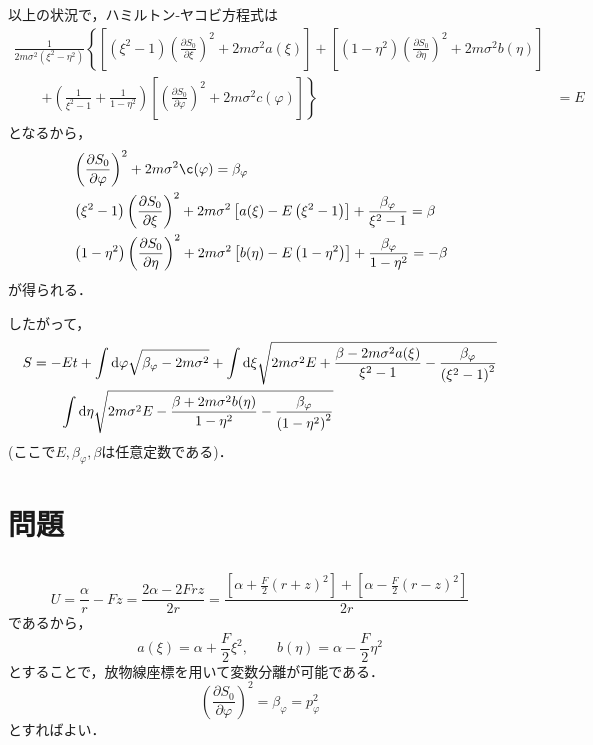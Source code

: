 \documentclass[a4paper,12pt]{jsarticle}
\newcommand{\pdif}[2]{\frac{\partial #1}{\partial #2}}
\begin{document}
	以上の状況で，ハミルトン-ヤコビ方程式は
	\begin{align}
	\frac{1}{2m \sigma^2 \left( \xi^2 - \eta^2 \right)} \left\{
	\left[ \left( \xi^2 - 1 \right)
	\left( \pdif{S_0}{\xi} \right)^2 + 2m \sigma^2 a(\xi) \right]
	+ \left[ \left( 1 - \eta^2 \right) \left( \pdif{S_0}{\eta} \right)^2
	+ 2m \sigma^2 b(\eta) \right] \right. & \\
	\qquad \left. + \left( \frac{1}{\xi^2 - 1} + \frac{1}{1 - \eta^2}\right)
	\left[ \left( \pdif{S_0}{\varphi} \right)^2
	+ 2m\sigma^2 c(\varphi) \right]
	\right\} &= E
	\end{align}
	となるから，
	\begin{align}
	&\left( \pdif{S_0}{\varphi} \right)^2 + 2m \sigma^2 \c(\varphi)
	= \beta_{\varphi} \\
	&\left( \xi^2 - 1 \right) \left( \pdif{S_0}{\xi} \right)^2
	+ 2m \sigma^2 \left[ a(\xi) - E \left( \xi^2 - 1 \right) \right]
	+ \frac{\beta_{\varphi}}{\xi^2 - 1} = \beta \\
	&\left( 1 - \eta^2 \right) \left( \pdif{S_0}{\eta} \right)^2
	+ 2m \sigma^2 \left[ b(\eta) - E \left( 1 - \eta^2 \right) \right]
	+ \frac{\beta_{\varphi}}{1 - \eta^2} = -\beta
	\end{align}
	が得られる．
	
	したがって，
	\begin{align}
	S &= -Et
	+ \int {\rm d} \varphi \sqrt{\beta_{\varphi} - 2m \sigma^2}
	+ \int{\rm d} \xi \sqrt{2m \sigma^2 E
		+ \frac{\beta - 2m \sigma^2 a(\xi)}{\xi^2 - 1}
		- \frac{\beta_{\varphi}}{\left( \xi^2 - 1 \right)^2}} \\
	&\qquad \int {\rm d} \eta \sqrt{2m \sigma^2 E
		- \frac{\beta + 2m \sigma^2 b(\eta)}{1 - \eta^2}
		- \frac{\beta_{\varphi}}{\left( 1 - \eta^2 \right)^2}}
	\end{align}
	(ここで$E, \beta_{\varphi}, \beta$は任意定数である)．
	
	\section{問題}
	\subsection{}
	\begin{equation}
	U = \frac{\alpha}{r} - Fz = \frac{2\alpha - 2Frz}{2r}
	=\frac{\left[ \alpha + \frac{F}{2}(r+z)^2 \right]
		+ \left[ \alpha - \frac{F}{2}(r-z)^2 \right]}{2r}
	\end{equation}
	であるから，
	\begin{equation}
	a(\xi) = \alpha + \frac{F}{2}\xi^2, \qquad
	b(\eta) = \alpha - \frac{F}{2}\eta^2
	\end{equation}
	とすることで，放物線座標を用いて変数分離が可能である．
	\begin{equation}
	\left(\pdif{S_0}{\varphi}\right)^2 = \beta_{\varphi} = p_{\varphi}^2
	\end{equation}
	とすればよい．
	
\end{document}
